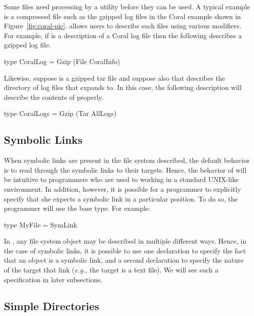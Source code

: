 \documentclass[nocopyrightspace,natbib]{sigplanconf}
\begin{document}
Some files need processing by a utility before they can be used.  A typical
example is a compressed file such as the gzipped log files in the Coral
example shown in Figure~\ref{fig:coral-pic}.  \forest{} allows users to describe such 
files using various modifiers.  For example, if  is a \padshaskell{}
description of a Coral log file then the following describes a gzipped log file.
\begin{code}
type CoralLog = Gzip (File CoralInfo)
\end{code}
Likewise, suppose  is a gzipped tar file and suppose also that 
 describes the directory of log files that  expands
to.  In this case, the following description will describe the contents of
 properly.
\begin{code}
type CoralLogs = Gzip (Tar AllLogs)
\end{code}

\subsection{Symbolic Links}
\label{sec:symlinks}

When symbolic links are present in the file system described,
the default behavior is to read through the symbolic links to their
targets.  Hence, the behavior of \forest{} will be intuitive to programmers who
are used to working in a standard UNIX-like environment.  In addition, however, it is possible
for a programmer to explicitly specify that she expects a symbolic link in a particular
position.  To do so, the programmer will use the  base type.  For
example:
\begin{code}
type MyFile = SymLink
\end{code}
In \forest{}, any file system object may be described in multiple different ways.
Hence, in the case of symbolic links, it is possible to use one declaration to
specify the fact that an object is a symbolic link, and a second declaration to specify
the nature of the target that link ({\em e.g.,} the target is a text file).  We will see such 
a specification in later subsections.

\subsection{Simple Directories}
\label{sec:simple-directories}
\end{document}
